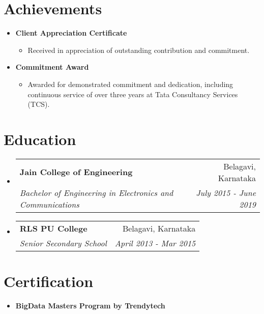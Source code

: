 \documentclass[letterpaper,11pt]{article}
\makeatletter
\newcommand{\resumeItem}[1]{
  \item\small{
    {#1 \vspace{-2pt}}
  }
}
\newcommand{\resumeSubheading}[4]{
  \vspace{-2pt}\item
    \begin{tabular*}{0.97\textwidth}[t]{l@{\extracolsep{\fill}}r}
      \textbf{#1} & #2 \\
      \textit{\small#3} & \textit{\small #4} \\
    \end{tabular*}\vspace{-7pt}
}
\newcommand{\resumeProjectHeading}[2]{
    \item
    \begin{tabular*}{0.97\textwidth}{l@{\extracolsep{\fill}}r}
      \small#1 & #2 \\
    \end{tabular*}\vspace{-7pt}
}
\newcommand{\resumeSubHeadingListStart}{\begin{itemize}[leftmargin=0.15in, label={}]}
\newcommand{\resumeSubHeadingListEnd}{\end{itemize}}
\newcommand{\resumeItemListStart}{\begin{itemize}}
\newcommand{\resumeItemListEnd}{\end{itemize}\vspace{-5pt}}
\makeatother
\begin{document}
\section{Achievements}
  \begin{itemize}
    \item \textbf{Client Appreciation Certificate}
    \begin{itemize}
      \item Received in appreciation of outstanding contribution and commitment.
    \end{itemize}
    \item \textbf{Commitment Award}
    \begin{itemize}
      \item Awarded for demonstrated commitment and dedication, including continuous service of over three years at Tata Consultancy Services (TCS).
    \end{itemize}
  \end{itemize}



\section{Education}
  \resumeSubHeadingListStart
    \resumeSubheading
      {Jain College of Engineering}{Belagavi, Karnataka}
      {Bachelor of Engineering in Electronics and Communications}{July 2015 - June 2019}
      \resumeSubheading
      {RLS PU College}{Belagavi, Karnataka}
      {Senior Secondary School}{April 2013 - Mar 2015}
    
  \resumeSubHeadingListEnd

\section{Certification}
  \begin{itemize}
    \item \textbf{BigData Masters Program by Trendytech}
    \end{itemize}
    


%
\end{document}
